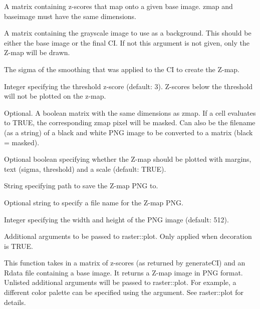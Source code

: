 \documentclass[letterpaper]{book}
\begin{document}
%
\begin{Arguments}
\begin{ldescription}
\item[\code{zmap}] A matrix containing z-scores that map onto a given base image. zmap and baseimage must have the same dimensions.

\item[\code{bgimage}] A matrix containing the grayscale image to use as a background. This should be either the base image or the final CI. If not this argument is not given, only the Z-map will be drawn.

\item[\code{sigma}] The sigma of the smoothing that was applied to the CI to create the Z-map.

\item[\code{threshold}] Integer specifying the threshold z-score (default: 3). Z-scores below the threshold will not be plotted on the z-map.

\item[\code{mask}] Optional. A boolean matrix with the same dimensions as zmap. If a cell evaluates to TRUE, the corresponding zmap pixel will be masked. Can also be the filename (as a string) of a black and white PNG image to be converted to a matrix (black = masked).

\item[\code{decoration}] Optional boolean specifying whether the Z-map should be plotted with margins, text (sigma, threshold) and a scale (default: TRUE).

\item[\code{targetpath}] String specifying path to save the Z-map PNG to.

\item[\code{filename}] Optional string to specify a file name for the Z-map PNG.

\item[\code{size}] Integer specifying the width and height of the PNG image (default: 512).

\item[\code{...}] Additional arguments to be passed to raster::plot. Only applied when decoration is TRUE.
\end{ldescription}
\end{Arguments}
%
\begin{Details}
This function takes in a matrix of z-scores (as returned by generateCI) and an Rdata file containing a base image. It returns a Z-map image in PNG format.
Unlisted additional arguments will be passed to raster::plot. For example, a different color palette can be specified using the  argument. See raster::plot for details.
\end{Details}
\end{document}

